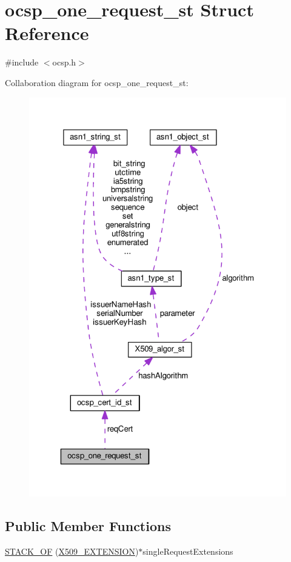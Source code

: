 \hypertarget{structocsp__one__request__st}{}\section{ocsp\+\_\+one\+\_\+request\+\_\+st Struct Reference}
\label{structocsp__one__request__st}


{\ttfamily \#include $<$ocsp.\+h$>$}



Collaboration diagram for ocsp\+\_\+one\+\_\+request\+\_\+st\+:
\nopagebreak
\begin{figure}[H]
\begin{center}
\leavevmode
\includegraphics[width=322pt]{structocsp__one__request__st__coll__graph}
\end{center}
\end{figure}
\subsection*{Public Member Functions}
\begin{DoxyCompactItemize}
\item 
\hyperlink{structocsp__one__request__st_afa4e9dd8e32ad379ef5f91c24ffd3e25}{S\+T\+A\+C\+K\+\_\+\+OF} (\hyperlink{x509_8h_ab2f7f7dc0ced8684e0cbfc818e408304}{X509\+\_\+\+E\+X\+T\+E\+N\+S\+I\+ON})$\ast$single\+Request\+Extensions
\end{DoxyCompactItemize}
